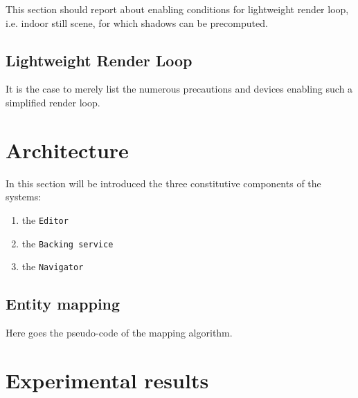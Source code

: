 \documentclass{sigchi}
\begin{document}
This section should report about enabling conditions for lightweight render loop, i.e. indoor still scene, for which shadows can be precomputed.


\subsection{Lightweight Render Loop} %
\label{sub:lightweight_render_loop}

It is the case to merely list the numerous precautions and devices enabling such a simplified render loop.


















\section{Architecture} %
\label{sec:architecture}

In this section will be introduced the three constitutive components of the systems:

\begin{enumerate}
  \item the {\tt Editor}
  \item the {\tt Backing service}
  \item the {\tt Navigator}
\end{enumerate}




\subsection{Entity mapping} %
\label{sub:entity_mapping}

Here goes the pseudo-code of the mapping algorithm.




\section{Experimental results} %
\label{sec:experimental_results}
\end{document}
